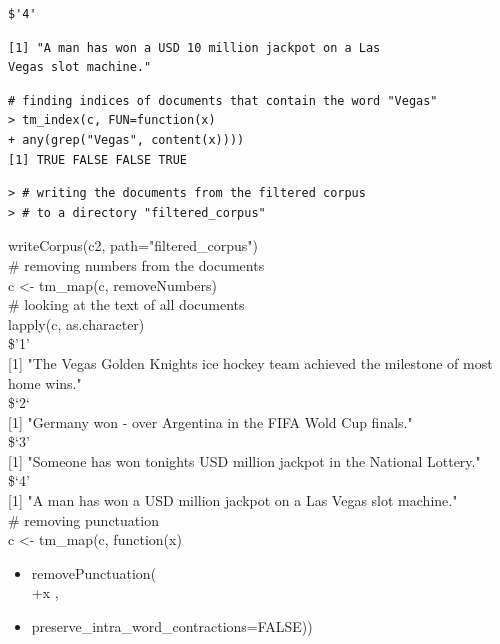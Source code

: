 \documentclass[11pt,openany,executivepaper]{book}
\begin{document}
\begin{verbatim}
$'4'
\end{verbatim}

\begin{verbatim}
[1] "A man has won a USD 10 million jackpot on a Las
Vegas slot machine."
\end{verbatim}

\begin{verbatim}
# finding indices of documents that contain the word "Vegas"
> tm_index(c, FUN=function(x)
+ any(grep("Vegas", content(x))))
[1] TRUE FALSE FALSE TRUE
\end{verbatim}

\begin{verbatim}
> # writing the documents from the filtered corpus
> # to a directory "filtered_corpus"
\end{verbatim}

\begin{displayquote}
writeCorpus(c2, path="filtered\_corpus")\\
\# removing numbers from the documents\\
c <- tm\_map(c, removeNumbers)\\
\# looking at the text of all documents\\
lapply(c, as.character)\\
\$'1'\\[0pt]
[1] "The Vegas Golden Knights ice hockey team achieved the milestone of most home wins."\\
\$‘2‘\\[0pt]
[1] "Germany won - over Argentina in the FIFA Wold Cup finals."\\
\$‘3’\\[0pt]
[1] "Someone has won tonights USD million jackpot in the National Lottery."\\
\$‘4’\\[0pt]
[1] "A man has won a USD million jackpot on a Las Vegas slot machine."\\
\# removing punctuation\\
c <- tm\_map(c, function(x)
\end{displayquote}

\begin{itemize}
  \item removePunctuation(\\
+x ,
  \item preserve\_intra\_word\_contractions=FALSE))
\end{itemize}
\end{document}
